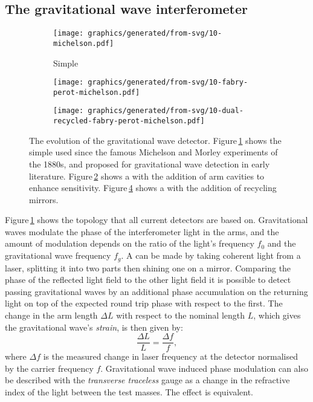 \subsection{\label{sec:gw-interferometry}The gravitational wave interferometer}

\begin{figure}
  \begin{center}
    \begin{subfigure}{.3\textwidth}
      \texttt{[image: graphics/generated/from-svg/10-michelson.pdf]}
      \caption{Simple \MI{}}
      \label{fig:mi}
    \end{subfigure}
    \hfill
    \begin{subfigure}{.3\textwidth}
      \texttt{[image: graphics/generated/from-svg/10-fabry-perot-michelson.pdf]}
      \caption{\FPMI{}}
      \label{fig:fpmi}
    \end{subfigure}
    \hfill
    \begin{subfigure}{.3\textwidth}
      \texttt{[image: graphics/generated/from-svg/10-dual-recycled-fabry-perot-michelson.pdf]}
      \caption{\DRFPMI{}}
      \label{fig:drfpmi}
    \end{subfigure}
    \caption[The evolution of the gravitational wave detector]{The evolution of the gravitational wave detector. Figure\,\ref{fig:mi} shows the simple \MI{} used since the famous Michelson and Morley experiments of the 1880s, and proposed for gravitational wave detection in early literature. Figure\,\ref{fig:fpmi} shows a \MI{} with the addition of \FP{} arm cavities to enhance sensitivity. Figure\,\ref{fig:drfpmi} shows a \FPMI{} with the addition of recycling mirrors.}
  \end{center}
\end{figure}

Figure\,\ref{fig:mi} shows the \MI{} topology that all current detectors are based on. Gravitational waves modulate the phase of the interferometer light in the arms, and the amount of modulation depends on the ratio of the light's frequency $f_0$ and the gravitational wave frequency $f_g$. A \MI{} can be made by taking coherent light from a laser, splitting it into two parts then shining one on a mirror. Comparing the phase of the reflected light field to the other light field it is possible to detect passing gravitational waves by an additional phase accumulation on the returning light on top of the expected round trip phase with respect to the first. The change in the arm length $\Delta L$ with respect to the nominal length $L$, which gives the gravitational wave's \emph{strain}, is then given by:
\begin{equation}
  \label{eq:freq-to-length}
  \frac{\Delta L}{L} = \frac{\Delta f}{f},
\end{equation}
where $\Delta f$ is the measured change in laser frequency at the detector normalised by the carrier frequency $f$. Gravitational wave induced phase modulation can also be described with the \emph{transverse traceless} gauge as a change in the refractive index of the light between the test masses. The effect is equivalent.

